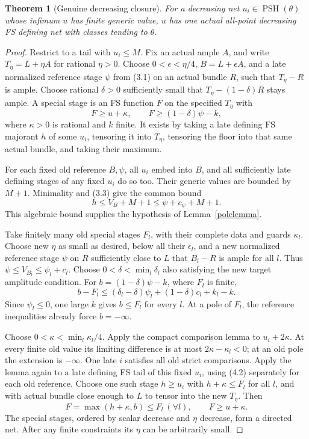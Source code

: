 \documentclass[10pt]{article}
\newtheorem{theorem}{Theorem}[section]
\newcommand{\PSH}{\operatorname{PSH}}
\begin{document}
\begin{theorem}[Genuine decreasing closure]\label{closure}
For a decreasing net $u_i\in\PSH(\theta)$ whose infimum $u$ has finite
generic value, $u$ has one actual all-point decreasing FS defining net with
classes tending to $\theta$.
\end{theorem}
\begin{proof}
Restrict to a tail with $u_i\leq M$. Fix an actual ample $A$, and write
$T_\eta=L+\eta A$ for rational $\eta>0$. Choose $0<\epsilon<\eta/4$,
$B=L+\epsilon A$, and a late normalized reference stage $\psi$ from (3.1)
on an actual bundle $R$, such that $T_\eta-R$ is ample. Choose rational
$\delta>0$ sufficiently small that $T_\eta-(1-\delta)R$ stays ample.
A special stage is an FS function $F$ on the specified $T_\eta$ with
\[
 F\geq u+\kappa,\qquad F\geq(1-\delta)\psi-k,       \tag{4.1}
\]
where $\kappa>0$ is rational and $k$ finite. It exists by taking a late
defining FS majorant $h$ of some $u_i$, tensoring it into $T_\eta$, tensoring
the floor into that same actual bundle, and taking their maximum.

For each fixed old reference $B,\psi$, all $u_i$ embed into $B$, and all
sufficiently late defining stages of any fixed $u_i$ do so too. Their generic
values are bounded by $M+1$. Minimality and (3.3) give the common bound
\[
 h\leq V_B+M+1\leq\psi+c_\psi+M+1.                \tag{4.2}
\]
This algebraic bound supplies the hypothesis of Lemma~\ref{polelemma}.

Take finitely many old special stages $F_l$, with their complete data and
guards $\kappa_l$. Choose new $\eta$ as small as desired, below all their
$\epsilon_l$, and a new normalized reference stage $\psi$ on $R$ sufficiently
close to $L$ that $B_l-R$ is ample for all $l$. Thus
$\psi\leq V_{B_l}\leq\psi_l+c_l$. Choose
$0<\delta<\min_l\delta_l$ also satisfying the new target amplitude condition.
For $b=(1-\delta)\psi-k$, where $F_l$ is finite,
\[
 b-F_l\leq(\delta_l-\delta)\psi_l+(1-\delta)c_l+k_l-k.
\]
Since $\psi_l\leq0$, one large $k$ gives $b\leq F_l$ for every $l$.
At a pole of $F_l$, the reference inequalities already force $b=-\infty$.

Choose $0<\kappa<\min_l\kappa_l/4$. Apply the compact comparison lemma to
$u_i+2\kappa$. At every finite old value its limiting difference is at most
$2\kappa-\kappa_l<0$; at an old pole the extension is $-\infty$.
One late $i$ satisfies all old strict comparisons. Apply the lemma again to
a late defining FS tail of this fixed $u_i$, using (4.2) separately for each
old reference. Choose one such stage $h\geq u_i$ with
$h+\kappa\leq F_l$ for all $l$, and with actual bundle close enough to $L$
to tensor into the new $T_\eta$. Then
\[
 F=\max(h+\kappa,b)\leq F_l\ (\forall l),\qquad F\geq u+\kappa.
                                                               \tag{4.3}
\]
The special stages, ordered by scalar decrease and $\eta$ decrease, form a
directed net. After any finite constraints its $\eta$ can be arbitrarily small.


\end{proof}
\end{document}
